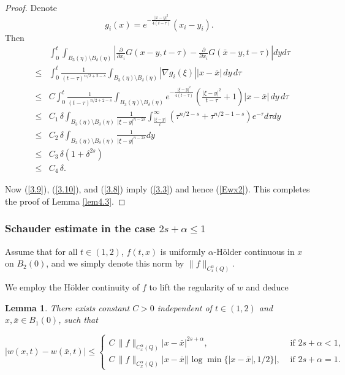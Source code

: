 \documentclass[12pt]{article}
\newtheorem{lemma}[definition]{Lemma}
\theoremstyle{remark}
\numberwithin{equation}{section}
\begin{document}
\begin{proof}
Denote
$$ g_i(x) =  e^{- \frac{|x-y|^2}{4(t-\tau)}} (x_i -y_i).$$
Then
\begin{eqnarray}
& & \int_0^t \int_{B_3(\eta) \setminus B_\delta (\eta)} | \frac{\partial}{\partial x_i} G(x-y, t-\tau) - \frac{\partial}{\partial x_i} G(\bar{x}-y, t-\tau) | d y d \tau  \nonumber \\
& \leq & \int_0^t \frac{1}{(t-\tau)^{n/2+2-s}} \int_{B_3(\eta) \setminus B_\delta (\eta)} |\nabla g_i(\xi)| |x - \bar{x}| \, d y \, d \tau \nonumber \\
& \leq & C \int_0^t \frac{1}{(t-\tau)^{n/2+2-s}} \int_{B_3(\eta) \setminus B_\delta (\eta)}  e^{-\frac{|\xi-y|^2}{4(t-\tau)}} \left( \frac{|\xi-y|^2}{t-\tau} + 1 \right) |x - \bar{x}| \, d y \, d \tau \nonumber \\
& \leq & C_1 \, \delta \int_{B_3(\eta) \setminus B_\delta (\eta)} \frac{1}{|\xi-y|^{n-2s}} \int_{\frac{|\xi-y|}{t}}^\infty ( \tau^{n/2-s} + \tau^{n/2-1-s} ) e^{-\tau} d \tau d y \nonumber \\
& \leq & C_2 \, \delta \int_{B_3(\eta) \setminus B_\delta (\eta)} \frac{1}{|\xi-y|^{n-2s}} d y \nonumber \\
& \leq & C_3 \, \delta ( 1 + \delta^{2s} ) \nonumber \\
& \leq & C_4 \, \delta.
\label{3.8}
\end{eqnarray}

Now (\ref{3.9}), (\ref{3.10}), and (\ref{3.8}) imply (\ref{3.3}) and hence (\ref{Ewx2}). This completes the proof of Lemma \ref{lem4.3}.
\end{proof}

\subsubsection{Schauder estimate in the case $2s + \alpha \leq 1$}

Assume that for all $t \in (1,2)$, $f(t,x)$ is uniformly $\alpha$-H\"{o}lder continuous in $x$ on $B_2(0)$, and we simply denote this norm by $\|f\|_{C_x^\alpha(Q)}$.


We employ the H\"{o}lder continuity of $f$ to lift the regularity of $w$ and deduce
\begin{lemma} \label{lem4.4}  There exists constant $C>0$ independent of $t \in (1,2)$ and $x, \bar{x} \in B_1(0)$, such that

\begin{equation} \label{Ewx3}
|w(x,t) - w(\bar{x}, t)| \leq  \left\{\begin{array}{ll} C \, \|f\|_{C_x^\alpha(Q)} |x - \bar{x}|^{2s+\alpha}, & \mbox{ if } 2s +\alpha < 1, \\
C \, \|f\|_{C_x^\alpha(Q)} |x - \bar{x}| |\log \min\{|x-\bar{x}|, 1/2\}|, & \mbox{ if } 2s + \alpha = 1.
\end{array}
\right.
\end{equation}
\end{lemma}
\end{document}
